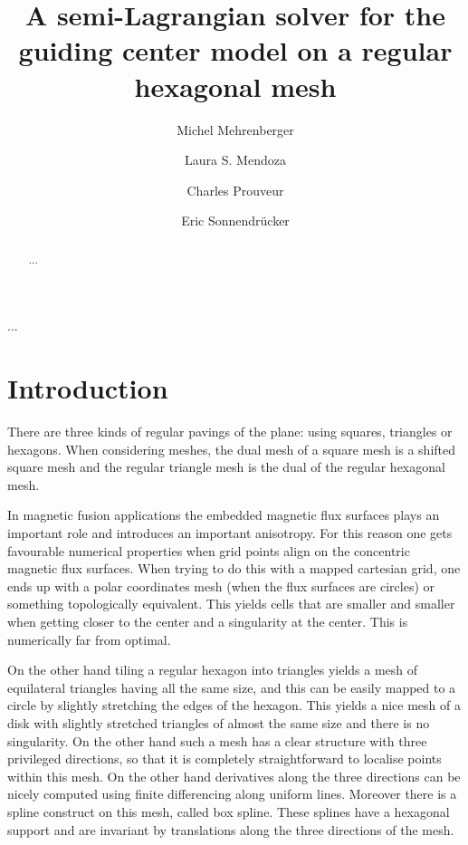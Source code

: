 \documentclass[proc]{edpsmath}
\begin{document}
\title{A semi-Lagrangian solver for the guiding center model on a regular hexagonal mesh}%
%
\author{Michel Mehrenberger} \address{IRMA, Universit\'e de Strasbourg, 7, rue Ren\'e Descartes, 67084 Strasbourg \& INRIA-Nancy Grand-Est, projet TONUS, 
}
\author{Laura S. Mendoza} \address{Max-Planck-Institut f\"{u}r Plasmaphysik, Boltzmannstr. 2, D-85748 Garching, } 
\author{Charles Prouveur}\address{...} %
\author{Eric Sonnendr\"{u}cker}
%
%

\begin{abstract} ... \end{abstract}
\begin{resume} ... \end{resume}

\maketitle


\section*{Introduction}

There are three kinds of regular pavings of the plane: using squares, triangles or hexagons. When considering meshes, the dual mesh of a square mesh is a shifted square mesh and the regular triangle mesh is the dual of the regular hexagonal mesh.

In magnetic fusion applications the embedded magnetic flux surfaces plays an important role and introduces an important anisotropy. For this reason one gets favourable numerical properties when grid points align on the concentric magnetic flux surfaces. When trying to do this with a mapped cartesian grid, one ends up with a polar coordinates mesh (when the flux surfaces are circles) or something topologically equivalent. This yields cells that are smaller and smaller when getting closer to the center and a singularity at the center. This is numerically far from optimal. 

On the other hand tiling a regular hexagon into triangles yields a mesh of equilateral triangles having all the same size, and this can be easily mapped to a circle by slightly stretching the edges of the hexagon. This yields a nice mesh of a disk with slightly stretched triangles of almost the same size and there is no singularity. 
On the other hand such a mesh has a clear structure with three privileged directions, so that it is completely straightforward to localise points within this mesh. On the other hand derivatives along the three directions can be nicely computed using finite differencing along uniform lines. Moreover there is a spline construct on this mesh, called box spline. These splines have a hexagonal support and are invariant by translations along the three directions of the mesh.
\end{document}
